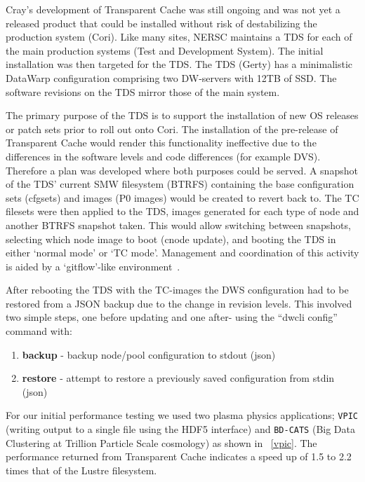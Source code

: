 \documentclass[10pt, conference, compsocconf]{IEEEtran}
\begin{document}
Cray's development of Transparent Cache was still ongoing and was not yet a released product that could be installed without risk of destabilizing the production system (Cori). Like many sites, NERSC maintains a TDS for each of the main production systems (Test and Development System).  The initial installation was then targeted for the TDS.  The TDS (Gerty) has a minimalistic DataWarp configuration comprising two DW-servers with 12TB of SSD.  The software revisions on  the TDS mirror those of the main system.

The primary purpose of the TDS is to support the installation of new OS releases or patch sets prior to roll out onto Cori.  The installation of the pre-release of Transparent Cache would render this functionality ineffective due to the differences in the software levels and code differences (for example DVS). Therefore a plan was developed where both purposes could be served.  A snapshot of the TDS' current SMW filesystem (BTRFS) containing the base configuration sets (cfgsets) and images (P0 images) would be created to revert back to. The TC filesets were then applied to the TDS, images generated for each type of node and another BTRFS snapshot taken.  This would allow switching between snapshots, selecting which node image to boot (cnode update), and booting the TDS in either `normal mode' or `TC mode'.  Management and coordination of this activity is aided by a `gitflow'-like environment~\cite{cug_git_smw}. 

After rebooting the TDS with the TC-images the DWS configuration had to be restored from a JSON backup due to the change in revision levels.  This involved two simple steps, one before updating and one after- using the ``dwcli config'' command with:
\begin{enumerate}
\item \textbf{backup} - backup node/pool configuration to stdout (json)
\item \textbf{restore} - attempt to restore a previously saved configuration from stdin (json)
\end{enumerate}

For our initial performance testing we used two plasma physics applications; \texttt{VPIC} (writing output to a single file using the HDF5 interface) and \texttt{BD-CATS} (Big Data Clustering at Trillion Particle Scale cosmology) as shown in \figurename~\ref{vpic}.  The performance returned from Transparent Cache indicates a speed up of 1.5 to 2.2 times that of the Lustre filesystem.
\end{document}
